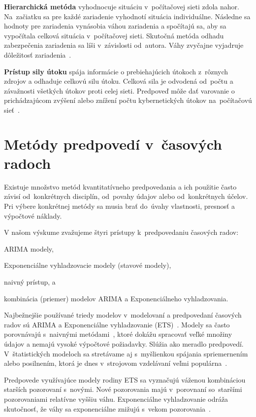 \documentclass[thesismargins, thesislinespacing, openright, upjsfrontpage]{rnthesis}
\begin{document}
\textbf{Hierarchická metóda} vyhodnocuje situáciu v~počítačovej sieti zdola nahor. Na~začiatku sa pre každé zariadenie vyhodnotí situácia individuálne. Následne sa hodnoty pre  zariadenia vynásobia váhou zariadenia a spočítajú sa, aby sa vypočítala celková situácia v~počítačovej sieti. Skutočná metóda odhadu zabezpečenia zariadenia  sa líši v~závislosti od~autora. Váhy zvyčajne vyjadruje dôležitosť zariadenia~\cite{Husak2018survey}.

\textbf{Prístup sily útoku} spája informácie o prebiehajúcich útokoch z~rôznych zdrojov a odhaduje celkovú silu útoku. Celková sila je odvodená od~počtu a závažnosti všetkých útokov proti celej sieti. Predpoveď môže dať varovanie o prichádzajúcom zvýšení alebo znížení počtu kybernetických útokov na~počítačovú sieť~\cite{Husak2018survey}.

\section{Metódy predpovedí v~časových radoch}

Existuje množstvo metód kvantitatívneho predpovedania a ich použitie často závisí od~konkrétnych disciplín, od~povahy údajov alebo od~konkrétnych účelov. Pri výbere konkrétnej metódy sa musia brať do~úvahy vlastnosti, presnosť a výpočtové náklady.

V našom výskume zvažujeme štyri prístupy k~predpovedaniu časových radov: 
\begin{compactenum}
    \item ARIMA modely,
    \item Exponenciálne vyhladzovacie modely (stavové modely),
    \item naivný prístup, a 
    \item kombinácia (priemer) modelov ARIMA a Exponenciálneho vyhladzovania.
\end{compactenum}

Najbežnejšie používané triedy modelov v~modelovaní a predpovedaní časových radov sú ARIMA a Exponenciálne vyhladzovanie (ETS)~\cite{hyndman2018forecasting}. Modely sa často porovnávajú s~naivnými metódami~\cite{brockwell2016introduction, box2015time}, ktoré dokážu spracovať veľké množiny údajov a nemajú vysoké výpočtové požiadavky. Slúžia ako meradlo predpovedí. V~štatistických modeloch sa stretávame aj s~myšlienkou spájania spriemernením alebo posilnením, ktorá je dnes v~strojovom vzdelávaní veľmi populárna~\cite{Husak2018survey}. 

Predpovede využívajúce modely rodiny ETS sa vyznačujú váženou kombináciou starších pozorovaní s~novými. Nové pozorovania majú v~porovnaní so~staršími pozorovaniami relatívne vyššiu váhu. Exponenciálne vyhladzovanie odráža skutočnosť, že váhy sa exponenciálne znižujú s~vekom pozorovania~\cite{hyndman2018forecasting,brockwell2016introduction}.
\end{document}
